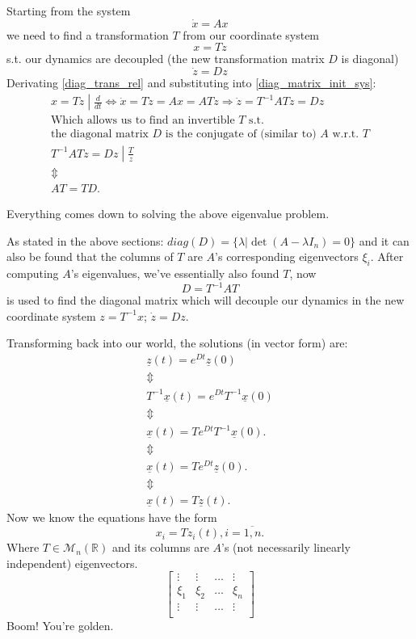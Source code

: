 Starting from the system
\begin{equation}\label{diag_matrix_init_sys}
	\dot{x} = A x
\end{equation}
we need to find a transformation $T$ from our coordinate system
\begin{equation}\label{diag_trans_rel}
	x = Tz
\end{equation}
s.t. our dynamics are decoupled (the new transformation matrix $D$ is diagonal)
\[
	\dot{z} = Dz
\]
Derivating \ref{diag_trans_rel} and substituting into \ref{diag_matrix_init_sys}:
\begin{gather*}
	\left. x = Tz \middle| \frac{d}{dt} \right. \iff
	\dot{x} = T\dot{z} = Ax = ATz \Rightarrow \dot{z} = T^{-1} A T z = Dz \\
	\text{Which allows us to find an invertible } T \text{ s.t.} \\
	\text{the diagonal matrix } D \text{ is the conjugate of (similar to) } A \text{ w.r.t. } T \\
	\left. T^{-1} A T z = Dz \middle| \frac{T}{z}
	\right. \\
	\Updownarrow \\
	A T = T D.
\end{gather*}

Everything comes down to solving the above eigenvalue problem.

As stated in the above sections: $diag(D) = \{ \lambda | \det(A - \lambda I_n) = 0 \}$ and it can also be found that the columns of $T$ are $A$'s corresponding eigenvectors $\xi_i$.
After computing $A$'s eigenvalues, we've essentially also found $T$, now
\[
	D = T^{-1} A T
\]
is used to find the diagonal matrix which will decouple our dynamics in the new coordinate system $z = T^{-1} x$; $\dot{z} = D z$.

Transforming back into our world, the solutions (in vector form) are:
\begin{gather*}
	\underline{z}(t) = e^{Dt}\underline{z}(0) \\
	\Updownarrow \\
	T^{-1} \underline{x}(t) = e^{Dt} T^{-1} \underline{x}(0) \\
	\Updownarrow \\
	\underline{x}(t) = T e^{Dt} T^{-1} \underline{x}(0). \\
	\Updownarrow \\
	\underline{x}(t) = T e^{Dt} \underline{z}(0). \\
	\Updownarrow \\
	\underline{x}(t) = T \underline{z}(t).
\end{gather*}
Now we know the equations have the form
\[
	x_i = T z_i(t), i = \overline{1,n}.
\]
Where $T \in \mathcal{M}_n(\mathbb{R})$ and its columns are $A$'s (not necessarily linearly independent) eigenvectors.
\begin{equation*}
	\begin{bmatrix*}
		\vdots & \vdots & \dots & \vdots \\
		\xi_1 & \xi_2 & \dots & \xi_n \\
		\vdots & \vdots & \dots & \vdots \\
	\end{bmatrix*}
\end{equation*}
Boom! You're golden.

